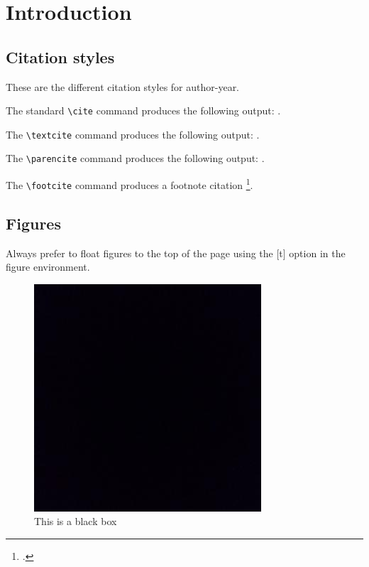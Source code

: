 \chapter{Introduction}
\label{chap:introduction}

\section{Citation styles}

These are the different citation styles for author-year.

The standard \verb=\cite= command produces the following output: \cite{clarke1990rendezvous}.

The \verb=\textcite= command produces the following output: \textcite{clarke1990rendezvous}.


The \verb=\parencite= command produces the following output: \parencite{clarke1990rendezvous}.

The \verb=\footcite= command produces a footnote citation \footcite{clarke1990rendezvous}.

\clearpage          %

\section{Figures}

Always prefer to float figures to the top of the page using the [t] option in the figure environment.

\begin{figure}[t]
    \centering
    \includegraphics[width=.4\textwidth]{figures/blackbox.jpeg}
    \caption{This is a black box}
    \label{fig:fig_1}
\end{figure}


